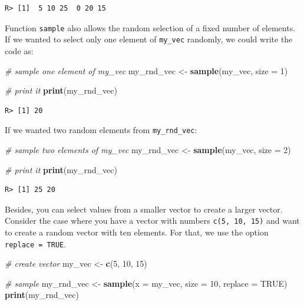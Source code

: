 \documentclass[
  12pt,
]{book}
\newenvironment{Shaded}{\begin{snugshade}}{\end{snugshade}}
\newcommand{\CommentTok}[1]{\textcolor[rgb]{0.37,0.37,0.37}{\textit{#1}}}
\newcommand{\DataTypeTok}[1]{\textcolor[rgb]{0.27,0.27,0.27}{#1}}
\newcommand{\DecValTok}[1]{\textcolor[rgb]{0.06,0.06,0.06}{#1}}
\newcommand{\KeywordTok}[1]{\textcolor[rgb]{0.27,0.27,0.27}{\textbf{#1}}}
\newcommand{\NormalTok}[1]{#1}
\newcommand{\OtherTok}[1]{\textcolor[rgb]{0.37,0.37,0.37}{#1}}
\newcommand{\StringTok}[1]{\textcolor[rgb]{0.5,0.5,0.5}{#1}}
\begin{document}
\begin{verbatim}
R> [1]  5 10 25  0 20 15
\end{verbatim}

Function \texttt{sample} also allows the random selection of a fixed number of elements. If we wanted to select only one element of \texttt{my\_vec} randomly, we could write the code as:

\begin{Shaded}
\begin{Highlighting}[]
\CommentTok{# sample one element of my_vec}
\NormalTok{my_rnd_vec <-}\StringTok{ }\KeywordTok{sample}\NormalTok{(my_vec, }\DataTypeTok{size =} \DecValTok{1}\NormalTok{)}

\CommentTok{# print it}
\KeywordTok{print}\NormalTok{(my_rnd_vec)}
\end{Highlighting}
\end{Shaded}

\begin{verbatim}
R> [1] 20
\end{verbatim}

If we wanted two random elements from \texttt{my\_rnd\_vec}:

\begin{Shaded}
\begin{Highlighting}[]
\CommentTok{# sample two elements of my_vec}
\NormalTok{my_rnd_vec <-}\StringTok{ }\KeywordTok{sample}\NormalTok{(my_vec, }\DataTypeTok{size =} \DecValTok{2}\NormalTok{)}

\CommentTok{# print it}
\KeywordTok{print}\NormalTok{(my_rnd_vec)}
\end{Highlighting}
\end{Shaded}

\begin{verbatim}
R> [1] 25 20
\end{verbatim}

Besides, you can select values from a smaller vector to create a larger vector. Consider the case where you have a vector with numbers \texttt{c(5,\ 10,\ 15)} and want to create a random vector with ten elements. For that, we use the option \texttt{replace\ =\ TRUE}.

\begin{Shaded}
\begin{Highlighting}[]
\CommentTok{# create vector}
\NormalTok{my_vec <-}\StringTok{ }\KeywordTok{c}\NormalTok{(}\DecValTok{5}\NormalTok{, }\DecValTok{10}\NormalTok{, }\DecValTok{15}\NormalTok{)}

\CommentTok{# sample}
\NormalTok{my_rnd_vec <-}\StringTok{ }\KeywordTok{sample}\NormalTok{(}\DataTypeTok{x =}\NormalTok{ my_vec, }\DataTypeTok{size =} \DecValTok{10}\NormalTok{, }\DataTypeTok{replace =} \OtherTok{TRUE}\NormalTok{)}
\KeywordTok{print}\NormalTok{(my_rnd_vec)}
\end{Highlighting}
\end{Shaded}
\end{document}
